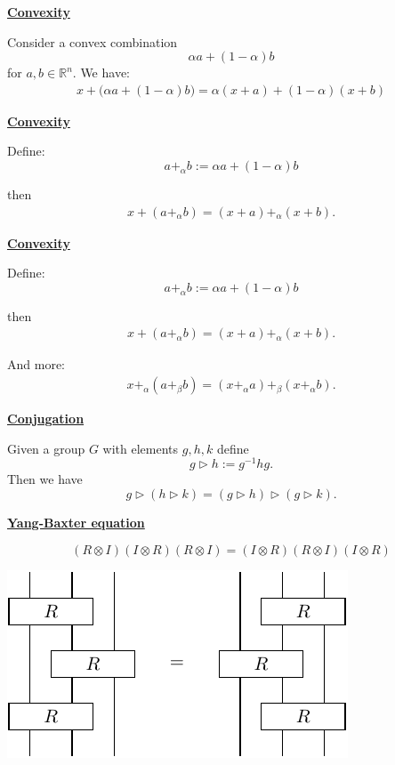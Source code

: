 \documentclass[11pt]{article}
\def\heading #1{\centerline{\underline{\bf\LARGE #1}}}
\def\vsp {\vskip 0.5cm}
\def\R{\mathbb R}
\def\tr{\triangleright}
\def\tensor{\otimes}
\begin{document}
\newpage %

\heading{Convexity}
\vsp

Consider a convex combination 
$$ \alpha a + (1-\alpha) b$$ 
for $a,b\in\R^n.$
We have:
\begin{align*}
    x + \bigl( \alpha a + (1-\alpha) b \bigr) = \alpha (x + a) + (1-\alpha) (x + b)
\end{align*}

\newpage %

\heading{Convexity}
\vsp

Define:
$$
    a+_\alpha b := \alpha a + (1-\alpha) b
$$

then
\begin{align*}
    x + ( a +_\alpha b ) = (x+a) +_\alpha (x+b).
\end{align*}

\newpage %

\heading{Convexity}
\vsp

Define:
$$
    a+_\alpha b := \alpha a + (1-\alpha) b
$$

then
\begin{align*}
    x + ( a +_\alpha b ) = (x+a) +_\alpha (x+b).
\end{align*}

And more:
\begin{align*}
    x +_\alpha ( a +_\beta b ) = (x+_\alpha a) +_\beta (x+_\alpha b).
\end{align*}


\newpage %

\heading{Conjugation}
\vsp

Given a group $G$
with elements $g, h, k$
define 
$$g\tr h := g^{-1} h g.$$
Then we have
$$
g \triangleright (h \triangleright k) = (g\triangleright h)\triangleright(g\triangleright k).
$$

\newpage %

\heading{Yang-Baxter equation}
\vsp

$$(R\tensor I) (I\tensor R) (R\tensor I) = (I\tensor R) (R\tensor I) (I\tensor R)$$
\vsp
\centerline{\includegraphics[]{pic-yb.pdf}}
\end{document}
